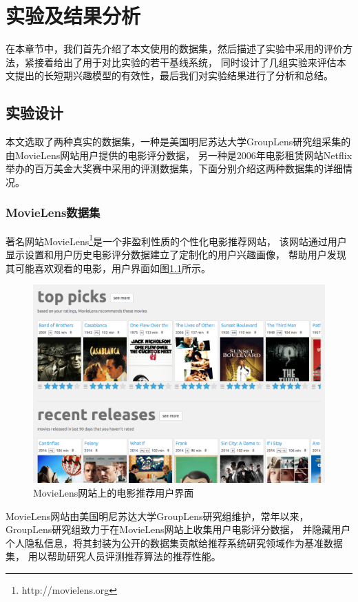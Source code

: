 \chapter{实验及结果分析}
在本章节中，我们首先介绍了本文使用的数据集，然后描述了实验中采用的评价方法，紧接着给出了用于对比实验的若干基线系统，
同时设计了几组实验来评估本文提出的长短期兴趣模型的有效性，最后我们对实验结果进行了分析和总结。

\section{实验设计}
本文选取了两种真实的数据集，一种是美国明尼苏达大学GroupLens研究组采集的由MovieLens网站用户提供的电影评分数据，
另一种是2006年电影租赁网站Netflix举办的百万美金大奖赛中采用的评测数据集，下面分别介绍这两种数据集的详细情况。

\subsection{MovieLens数据集}
著名网站MovieLens\footnote{http://movielens.org}是一个非盈利性质的个性化电影推荐网站，
该网站通过用户显示设置和用户历史电影评分数据建立了定制化的用户兴趣画像，
帮助用户发现其可能喜欢观看的电影，用户界面如图\ref{fig:movielens}所示。

\begin{figure}[htbp]
\centering
\includegraphics[scale=0.36]{images/movielens.png}
\caption{MovieLens网站上的电影推荐用户界面}
\label{fig:movielens}
\end{figure}

MovieLens网站由美国明尼苏达大学GroupLens研究组维护，常年以来，
GroupLens研究组致力于在MovieLens网站上收集用户电影评分数据，
并隐藏用户个人隐私信息，将其封装为公开的数据集贡献给推荐系统研究领域作为基准数据集，
用以帮助研究人员评测推荐算法的推荐性能。

